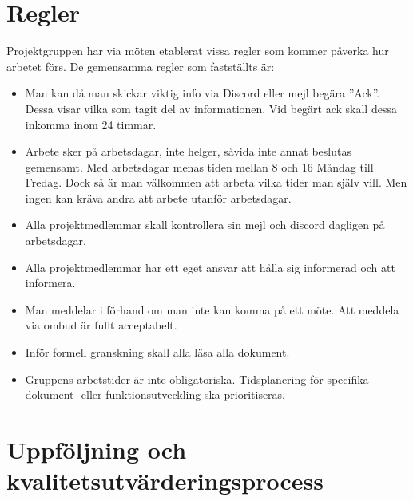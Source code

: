 \documentclass[paper=a4, fontsize=11pt,twoside]{article}
\begin{document}
\section{Regler}
Projektgruppen har via möten etablerat vissa regler som kommer påverka hur arbetet förs.
De gemensamma regler som fastställts är:
\begin{itemize}
\item Man kan då man skickar viktig info via Discord eller mejl begära ''Ack''. Dessa visar vilka som tagit del av informationen. Vid begärt ack skall dessa inkomma inom 24 timmar.
\item Arbete sker på arbetsdagar, inte helger, såvida inte annat beslutas gemensamt. Med arbetsdagar menas tiden mellan 8 och 16 Måndag till Fredag. Dock så är man välkommen att arbeta vilka tider man själv vill. Men ingen kan kräva andra att arbete utanför arbetsdagar.
\item Alla projektmedlemmar skall kontrollera sin mejl och discord dagligen på arbetsdagar. 
\item Alla projektmedlemmar har ett eget ansvar att hålla sig informerad och att informera.
\item Man meddelar i förhand om man inte kan komma på ett möte. Att meddela via ombud är fullt acceptabelt.
\item Inför formell granskning skall alla läsa alla dokument. 
\item Gruppens arbetstider är inte obligatoriska. Tidsplanering för specifika
dokument- eller funktionsutveckling ska prioritiseras.
\end{itemize}

\section{Uppföljning och kvalitetsutvärderingsprocess}
\end{document}
